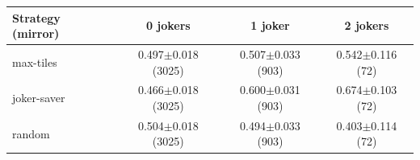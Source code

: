 \begin{tabular}{@{}lccc@{}}\toprule
Strategy (mirror) & 0 jokers & 1 joker & 2 jokers\\\midrule
max-tiles & 0.497$\pm$0.018 (3025) & 0.507$\pm$0.033 (903) & 0.542$\pm$0.116 (72) \\
joker-saver & 0.466$\pm$0.018 (3025) & 0.600$\pm$0.031 (903) & 0.674$\pm$0.103 (72) \\
random & 0.504$\pm$0.018 (3025) & 0.494$\pm$0.033 (903) & 0.403$\pm$0.114 (72) \\
\bottomrule
\end{tabular}
